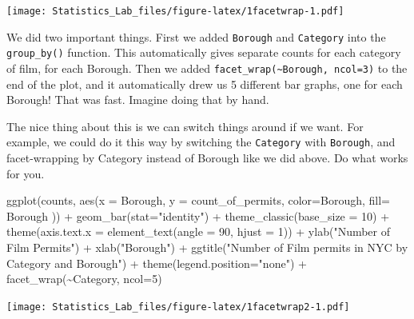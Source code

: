 \documentclass[
]{book}
\newenvironment{Shaded}{\begin{snugshade}}{\end{snugshade}}
\newcommand{\AttributeTok}[1]{\textcolor[rgb]{0.77,0.63,0.00}{#1}}
\newcommand{\DecValTok}[1]{\textcolor[rgb]{0.00,0.00,0.81}{#1}}
\newcommand{\FunctionTok}[1]{\textcolor[rgb]{0.00,0.00,0.00}{#1}}
\newcommand{\NormalTok}[1]{#1}
\newcommand{\SpecialCharTok}[1]{\textcolor[rgb]{0.00,0.00,0.00}{#1}}
\newcommand{\StringTok}[1]{\textcolor[rgb]{0.31,0.60,0.02}{#1}}
\begin{document}
\texttt{[image: Statistics\_Lab\_files/figure-latex/1facetwrap-1.pdf]}

We did two important things. First we added \texttt{Borough} and \texttt{Category} into the \texttt{group\_by()} function. This automatically gives separate counts for each category of film, for each Borough. Then we added \texttt{facet\_wrap(\textasciitilde{}Borough,\ ncol=3)} to the end of the plot, and it automatically drew us 5 different bar graphs, one for each Borough! That was fast. Imagine doing that by hand.

The nice thing about this is we can switch things around if we want. For example, we could do it this way by switching the \texttt{Category} with \texttt{Borough}, and facet-wrapping by Category instead of Borough like we did above. Do what works for you.

\begin{Shaded}
\begin{Highlighting}[]
\FunctionTok{ggplot}\NormalTok{(counts, }\FunctionTok{aes}\NormalTok{(}\AttributeTok{x =}\NormalTok{ Borough, }\AttributeTok{y =}\NormalTok{ count\_of\_permits, }
                   \AttributeTok{color=}\NormalTok{Borough, }
                   \AttributeTok{fill=}\NormalTok{ Borough )) }\SpecialCharTok{+}
  \FunctionTok{geom\_bar}\NormalTok{(}\AttributeTok{stat=}\StringTok{"identity"}\NormalTok{) }\SpecialCharTok{+} 
  \FunctionTok{theme\_classic}\NormalTok{(}\AttributeTok{base\_size =} \DecValTok{10}\NormalTok{) }\SpecialCharTok{+}
  \FunctionTok{theme}\NormalTok{(}\AttributeTok{axis.text.x =} \FunctionTok{element\_text}\NormalTok{(}\AttributeTok{angle =} \DecValTok{90}\NormalTok{, }\AttributeTok{hjust =} \DecValTok{1}\NormalTok{)) }\SpecialCharTok{+}
  \FunctionTok{ylab}\NormalTok{(}\StringTok{"Number of Film Permits"}\NormalTok{) }\SpecialCharTok{+} 
  \FunctionTok{xlab}\NormalTok{(}\StringTok{"Borough"}\NormalTok{) }\SpecialCharTok{+}
  \FunctionTok{ggtitle}\NormalTok{(}\StringTok{"Number of Film permits in NYC by Category and Borough"}\NormalTok{) }\SpecialCharTok{+}
  \FunctionTok{theme}\NormalTok{(}\AttributeTok{legend.position=}\StringTok{"none"}\NormalTok{) }\SpecialCharTok{+}
  \FunctionTok{facet\_wrap}\NormalTok{(}\SpecialCharTok{\textasciitilde{}}\NormalTok{Category, }\AttributeTok{ncol=}\DecValTok{5}\NormalTok{)}
\end{Highlighting}
\end{Shaded}

\texttt{[image: Statistics\_Lab\_files/figure-latex/1facetwrap2-1.pdf]}
\end{document}
